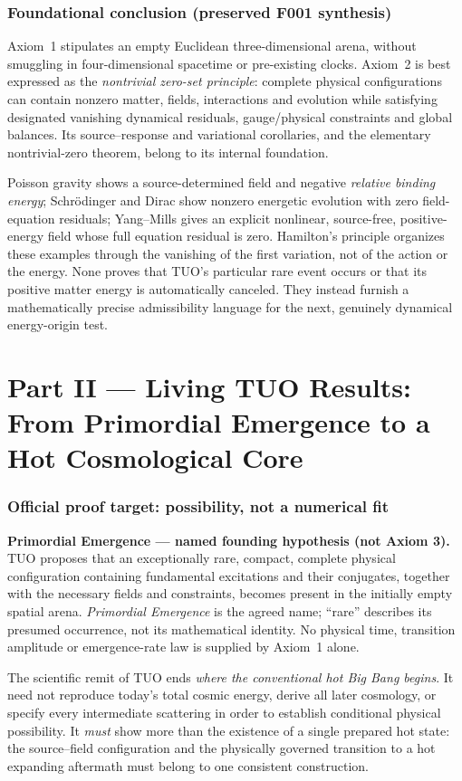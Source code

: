 \documentclass[11pt,a4paper]{article}
\theoremstyle{tmon}
\theoremstyle{definition}
\begin{document}
\section{Foundational conclusion (preserved F001 synthesis)}
Axiom~1 stipulates an empty Euclidean three-dimensional arena, without smuggling in four-dimensional spacetime or pre-existing clocks. Axiom~2 is best expressed as the \emph{nontrivial zero-set principle}: complete physical configurations can contain nonzero matter, fields, interactions and evolution while satisfying designated vanishing dynamical residuals, gauge/physical constraints and global balances. Its source--response and variational corollaries, and the elementary nontrivial-zero theorem, belong to its internal foundation.

Poisson gravity shows a source-determined field and negative \emph{relative binding energy}; Schr\"odinger and Dirac show nonzero energetic evolution with zero field-equation residuals; Yang--Mills gives an explicit nonlinear, source-free, positive-energy field whose full equation residual is zero. Hamilton's principle organizes these examples through the vanishing of the first variation, not of the action or the energy. None proves that TUO's particular rare event occurs or that its positive matter energy is automatically canceled. They instead furnish a mathematically precise admissibility language for the next, genuinely dynamical energy-origin test.

\clearpage
\part*{Part II --- Living TUO Results: From Primordial Emergence to a Hot Cosmological Core}

\section{Official proof target: possibility, not a numerical fit}\label{sec:objective}
\begin{axiombox}
\textbf{Primordial Emergence --- named founding hypothesis (not Axiom 3).}
TUO proposes that an exceptionally rare, compact, complete physical configuration containing fundamental excitations and their conjugates, together with the necessary fields and constraints, becomes present in the initially empty spatial arena. \emph{Primordial Emergence} is the agreed name; ``rare'' describes its presumed occurrence, not its mathematical identity. No physical time, transition amplitude or emergence-rate law is supplied by Axiom~1 alone.
\end{axiombox}
The scientific remit of TUO ends \emph{where the conventional hot Big Bang begins}. It need not reproduce today's total cosmic energy, derive all later cosmology, or specify every intermediate scattering in order to establish conditional physical possibility. It \emph{must} show more than the existence of a single prepared hot state: the source--field configuration and the physically governed transition to a hot expanding aftermath must belong to one consistent construction.
\end{document}
